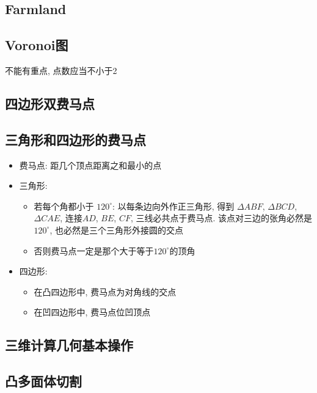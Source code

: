 \documentclass[landscape, twocolumn, 8pt, a4paper, twoside]{extarticle}
\begin{document}
  \subsection{Farmland}
  

  \subsection{Voronoi图}
  不能有重点, 点数应当不小于2
  

  \subsection{四边形双费马点}
  

  \subsection{三角形和四边形的费马点}
  \begin{itemize}
  \item 费马点: 距几个顶点距离之和最小的点
  \item 三角形:
      \begin{itemize}
      \item 若每个角都小于 $120^{\circ}$: 以每条边向外作正三角形, 得到 $\Delta ABF$, $\Delta BCD$, $\Delta CAE$, 连接$AD$, $BE$, $CF$, 三线必共点于费马点. 该点对三边的张角必然是$120^{\circ}$, 也必然是三个三角形外接圆的交点
      \item 否则费马点一定是那个大于等于$120^{\circ}$的顶角
      \end{itemize}
  \item 四边形:
      \begin{itemize}
        \item 在凸四边形中, 费马点为对角线的交点
        \item 在凹四边形中, 费马点位凹顶点
      \end{itemize}
  \end{itemize}

  \subsection{三维计算几何基本操作}
  

  \subsection{凸多面体切割}
  
\end{document}
